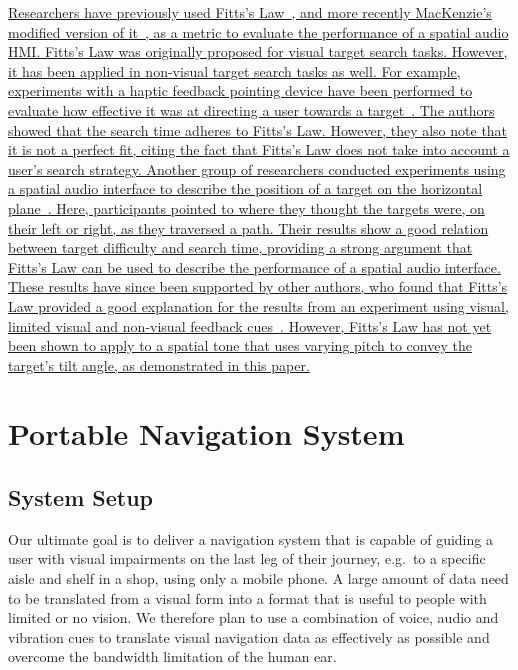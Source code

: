 \documentclass[sigconf, screen=true, anonymous=true]{acmart}
\begin{document}
\uline{Researchers have previously used Fitts's Law~\cite{fitts1954information}, and more recently MacKenzie's modified version of it~\cite{mackenzie1992fitts}, as a metric to evaluate the performance of a spatial audio HMI\@.
Fitts's Law was originally proposed for visual target search tasks.
However, it has been applied in non-visual target search tasks as well.
For example, experiments with a haptic feedback pointing device have been performed to evaluate how effective it was at directing a user towards a target~\cite{ahmaniemi2009augmented}.
The authors showed that the search time adheres to Fitts's Law.
However, they also note that it is not a perfect fit, citing the fact that Fitts's Law does not take into account a user's search strategy.
Another group of researchers conducted experiments using a spatial audio interface to describe the position of a target on the horizontal plane~\cite{marentakis2006effects}.
Here, participants pointed to where they thought the targets were, on their left or right, as they traversed a path.
Their results show a good relation between target difficulty and search time, providing a strong argument that Fitts's Law can be used to describe the performance of a spatial audio interface.
These results have since been supported by other authors, who found that Fitts's Law provided a good explanation for the results from an experiment using visual, limited visual and non-visual feedback cues~\cite{wu2010fitts}.
However, Fitts's Law has not yet been shown to apply to a spatial tone that uses varying pitch to convey the target's tilt angle, as demonstrated in this paper.}

\section{Portable Navigation System}\label{sec:portable-navigation}

\subsection{System Setup}

Our ultimate goal is to deliver a navigation system that is capable of guiding a user with visual impairments on the last leg of their journey, e.g.\ to a specific aisle and shelf in a shop, using only a mobile phone.
A large amount of data need to be translated from a visual form into a format that is useful to people with limited or no vision.
We therefore plan to use a combination of voice, audio and vibration cues to translate visual navigation data as effectively as possible and overcome the bandwidth limitation of the human ear. 
\end{document}
